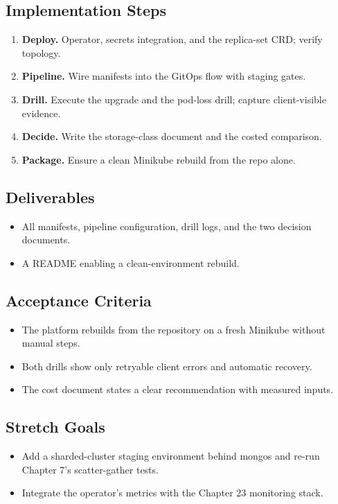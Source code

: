 \subsection*{Implementation Steps}
\begin{enumerate}
    \item \textbf{Deploy.} Operator, secrets integration, and the replica-set CRD; verify topology.
    \item \textbf{Pipeline.} Wire manifests into the GitOps flow with staging gates.
    \item \textbf{Drill.} Execute the upgrade and the pod-loss drill; capture client-visible evidence.
    \item \textbf{Decide.} Write the storage-class document and the costed comparison.
    \item \textbf{Package.} Ensure a clean Minikube rebuild from the repo alone.
\end{enumerate}

\subsection*{Deliverables}
\begin{itemize}
    \item All manifests, pipeline configuration, drill logs, and the two decision documents.
    \item A README enabling a clean-environment rebuild.
\end{itemize}

\subsection*{Acceptance Criteria}
\begin{itemize}
    \item The platform rebuilds from the repository on a fresh Minikube without manual steps.
    \item Both drills show only retryable client errors and automatic recovery.
    \item The cost document states a clear recommendation with measured inputs.
\end{itemize}

\subsection*{Stretch Goals}
\begin{itemize}
    \item Add a sharded-cluster staging environment behind mongos and re-run Chapter 7's scatter-gather tests.
    \item Integrate the operator's metrics with the Chapter 23 monitoring stack.
\end{itemize}
